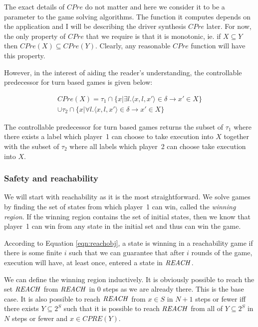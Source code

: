The exact details of $CPre$ do not matter and here we consider it to be a parameter to the game solving algorithms. The function it computes depends on the application and I will be describing the driver synthesis $CPre$ later. For now, the only property of $CPre$ that we require is that it is monotonic, ie. if $X \subseteq Y$ then $CPre(X) \subseteq CPre(Y)$. Clearly, any reasonable $CPre$ function will have this property.

However, in the interest of aiding the reader's understanding, the controllable predecessor for turn based games is given below:

\begin{multline}
CPre(X) = \tau_1 \cap \{x | \exists l. \langle x, l, x' \rangle \in \delta \rightarrow x' \in X\} \\ \cup \tau_2 \cap \{x | \forall l. \langle x, l, x' \rangle \in \delta \rightarrow x' \in X \}
\end{multline}

The controllable predecessor for turn based games returns the subset of $\tau_1$ where there exists a label which player~1 can choose to take execution into $X$ together with the subset of $\tau_2$ where all labels which player~2 can choose take execution into $X$. 

\subsubsection{Safety and reachability}

We will start with reachability as it is the most straightforward. We solve games by finding the set of states from which player~1 can win, called the \emph{winning region}. If the winning region contains the set of initial states, then we know that player~1 can win from any state in the initial set and thus can win the game.

According to Equation \ref{eqn:reachobj}, a state is winning in a reachability game if there is some finite $i$ such that we can guarantee that after $i$ rounds of the game, execution will have, at least once, entered a state in $\mathit{REACH}$. 

We can define the winning region inductively. It is obviously possible to reach the set $\mathit{REACH}$ from $\mathit{REACH}$ in 0 steps as we are already there. This is the base case. It is also possible to reach $\mathit{REACH}$ from $x \in S$ in $N + 1$ steps or fewer iff there exists $Y\subseteq 2^S$ such that it is possible to reach $\mathit{REACH}$ from all of $Y \subseteq 2^S$ in $N$ steps or fewer and $x \in CPRE(Y)$.

